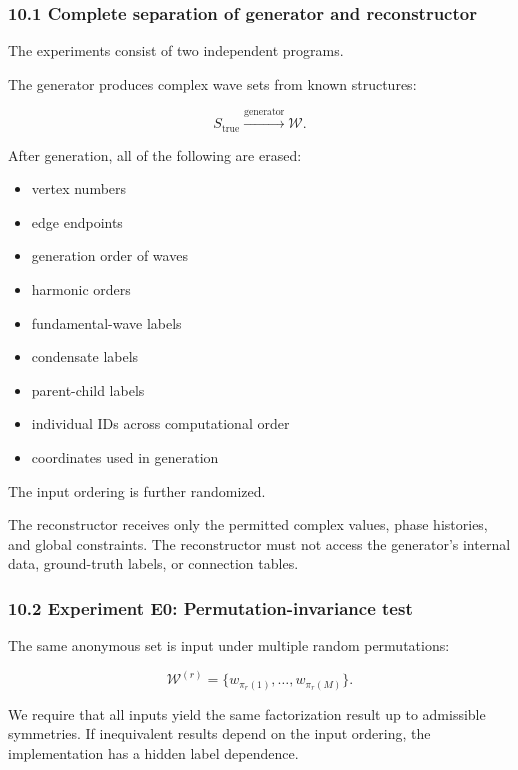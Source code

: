 \documentclass[
  a4paper,
]{article}
\providecommand{\tightlist}{%
  \setlength{\itemsep}{0pt}\setlength{\parskip}{0pt}}
\begin{document}
\subsubsection{10.1 Complete separation of generator and
reconstructor}\label{complete-separation-of-generator-and-reconstructor}

The experiments consist of two independent programs.

The generator produces complex wave sets from known structures:

\[
S_{\mathrm{true}}
\xrightarrow{\mathrm{generator}}
\mathcal W.
\]

After generation, all of the following are erased:

\begin{itemize}
\tightlist
\item
  vertex numbers
\item
  edge endpoints
\item
  generation order of waves
\item
  harmonic orders
\item
  fundamental-wave labels
\item
  condensate labels
\item
  parent-child labels
\item
  individual IDs across computational order
\item
  coordinates used in generation
\end{itemize}

The input ordering is further randomized.

The reconstructor receives only the permitted complex values, phase
histories, and global constraints. The reconstructor must not access the
generator's internal data, ground-truth labels, or connection tables.

\subsubsection{10.2 Experiment E0: Permutation-invariance
test}\label{experiment-e0-permutation-invariance-test}

The same anonymous set is input under multiple random permutations:

\[
\mathcal W^{(r)}
=
\{w_{\pi_r(1)},\ldots,w_{\pi_r(M)}\}.
\]

We require that all inputs yield the same factorization result up to
admissible symmetries. If inequivalent results depend on the input
ordering, the implementation has a hidden label dependence.
\end{document}

